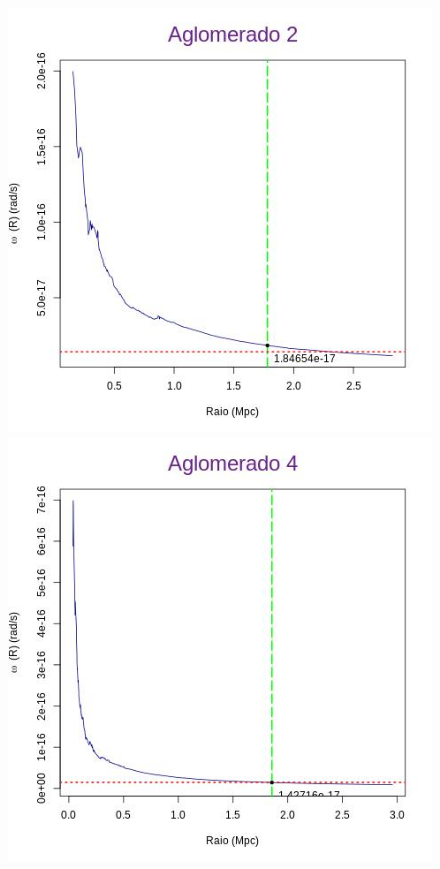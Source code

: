 \begin{apendicesenv}
\begin{figure}[H] %
\vspace{-2pt}
\begin{center}
\includegraphics[scale=.3]{04-figuras/selec20/perfil02}%
\includegraphics[scale=.3]{04-figuras/selec20/perfil04}

\end{center}
\end{figure}
\end{apendicesenv}
